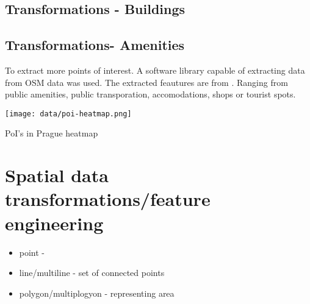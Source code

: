 \subsection{Transformations - Buildings}
\subsection{Transformations- Amenities}

To extract more points of interest. A software library  capable of extracting data from \acrshort{OSM} data was used. The extracted feautures are from . Ranging from public amenities, public transporation, accomodations, shops or tourist spots.

\begin{marginfigure}
    \texttt{[image: data/poi-heatmap.png]}
    \caption{}{PoI's in Prague heatmap}
\end{marginfigure}




\section{Spatial data transformations/feature engineering}
\label{sec:spatial-transformations}

\begin{kaobox}[frametitle=Spatial data types]

    \begin{itemize}
        \item{point} -
        \item{line/multiline} - set of connected points
        \item{polygon/multiplogyon} - representing area
    \end{itemize}
\end{kaobox}

